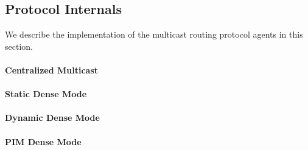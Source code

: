 \subsection{Protocol Internals}
\label{sec:mcastproto-internals}

We describe the implementation of the
multicast routing protocol agents in this section.

\paragraph{Centralized Multicast}

\paragraph{Static Dense Mode}

\paragraph{Dynamic Dense Mode}

\paragraph{PIM Dense Mode}

\endinput
